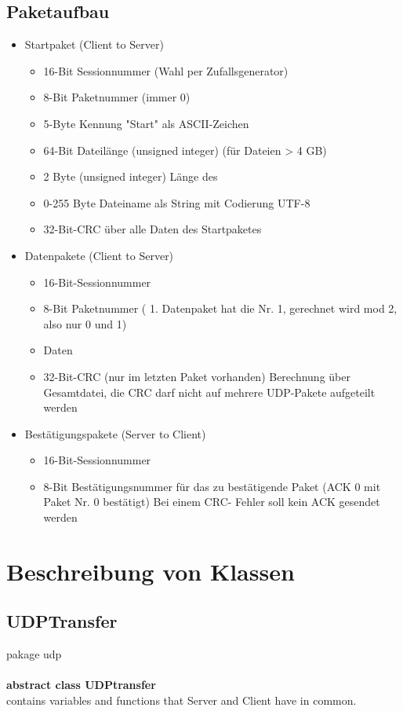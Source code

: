 \documentclass[12pt]{article}
\begin{document}
\subsection{Paketaufbau}
\begin{itemize}
\item Startpaket (Client to Server)
\begin{itemize}
\item 16-Bit Sessionnummer (Wahl per Zufallsgenerator)
\item 8-Bit Paketnummer (immer 0)
\item 5-Byte Kennung "Start" als ASCII-Zeichen
\item 64-Bit Dateilänge (unsigned integer) (für Dateien > 4 GB)
\item 2 Byte (unsigned integer) Länge des
\item 0-255 Byte Dateiname als String mit Codierung UTF-8
\item 32-Bit-CRC über alle Daten des Startpaketes
\end{itemize}
\item Datenpakete (Client to Server)
\begin{itemize}
\item 16-Bit-Sessionnummer
\item 8-Bit Paketnummer ( 1. Datenpaket hat die Nr. 1, gerechnet wird mod 2, also nur 0 und 1)
\item Daten
\item 32-Bit-CRC (nur im letzten Paket vorhanden) Berechnung über Gesamtdatei, die CRC darf nicht auf mehrere UDP-Pakete aufgeteilt werden
\end{itemize}
\item Bestätigungspakete (Server to Client)
\begin{itemize}
\item 16-Bit-Sessionnummer
\item 8-Bit Bestätigungsnummer für das zu bestätigende Paket (ACK 0 mit Paket Nr. 0 bestätigt)
Bei einem CRC- Fehler soll kein ACK gesendet werden
\end{itemize}
\end{itemize}

\section{Beschreibung von Klassen}
\subsection{UDPTransfer}
pakage udp \\ \\
\textbf{\Large   abstract class UDPtransfer } \\
contains variables and functions that Server and Client have in common.
\\ \\
\end{document}
